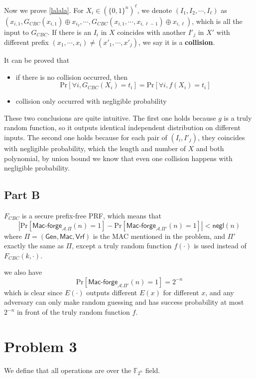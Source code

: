 \documentclass[8pt]{article}
\theoremstyle{compact}
\begin{document}
Now we prove \cref{lalala}. For $X_i \in (\{0, 1\}^n)^{\ell}$, we denote $(I_1, I_2, \cdots, I_{\ell})$ as $(x_{i, 1}, G_{CBC}(x_{i, 1}) \oplus x_{i_2}, \cdots, G_{CBC}(x_{i, 1}, \cdots, x_{i, \ell-1}) \oplus x_{i, \ell})$, which is all the input to $G_{CBC}$. If there is an $I_i$ in $X$ coincides with another $I'_j$ in $X'$ with different prefix $(x_1, \cdots, x_i) \neq (x'_1, \cdots, x'_j)$, we say it is a \textbf{collision}.

It can be proved that \begin{itemize}
	\item if there is no collision occurred, then $$\text{Pr}\left[\forall i, G_{CBC}(X_i) = t_i\right] = \text{Pr}\left[\forall i, f(X_i) = t_i\right]$$
	\item collision only occurred with negligible probability
\end{itemize}

These two conclusions are quite intuitive. The first one holds because $g$ is a truly random function, so it outputs identical independent distribution on different inputs. The second one holds because for each pair of $(I_i, I'_j)$, they coincides with negligible probability, which the length and number of $X$ and both polynomial, by union bound we know that even one collision happens with negligible probability.

\subsection*{Part B}

$F_{CBC}$ is a secure prefix-free PRF, which means that $$\left| \text{Pr}\left[\textsf{Mac-forge}_{\mathcal A. \Pi}(n) = 1\right] - \text{Pr}\left[\textsf{Mac-forge}_{\mathcal A. \Pi'}(n) = 1\right] \right| < \textsf{negl}(n)$$
where $\Pi = (\textsf{Gen}, \textsf{Mac}, \textsf{Vrf})$ is the MAC mentioned in the problem, and $\Pi'$ exactly the same as $\Pi$, except a truly random function $f(\cdot)$ is used instead of $F_{CBC}(k, \cdot)$.

we also have
$$\text{Pr}\left[\textsf{Mac-forge}_{\mathcal A. \Pi'}(n) = 1\right] = 2^{-n}$$ which is clear since $E(\cdot)$ outputs different $E(x)$ for different $x$, and any adversary can only make random guessing and has success probability at most $2^{-n}$ in front of the truly random function $f$.

\section*{Problem 3}
We define that all operations are over the $\mathbb F_{2^n}$ field.
\end{document}
